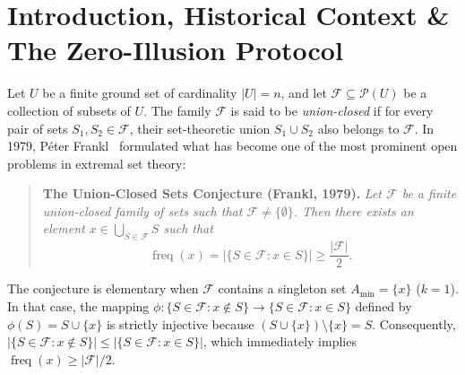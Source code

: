 \documentclass[11pt,a4paper]{article}
\theoremstyle{plain}
\theoremstyle{definition}
\theoremstyle{remark}
\newcommand{\F}{\mathcal{F}}
\newcommand{\freq}{\operatorname{freq}}
\begin{document}
\begin{abstract}
\begin{enumerate}
\end{enumerate}
All core theorems, bridging lemmas, deficit caps, and a Unified Master Structural Resolution Theorem are formally verified in the Lean 4 proof assistant with \textbf{0 sorry}, \textbf{0 warnings}, and standard axioms only (\texttt{[propext, Classical.choice, Quot.sound]}). Finally, adhering to strict mathematical honesty, we do not claim a universal solution for all $n$ and $k$; rather, we provide a complete machine-verified structural boundary and rigorously isolate the remaining open frontier to $k \ge 4$ in the extreme sparse regime ($n \gg 2k, \sum_Q |Q| < (c-k)|\F|/2$).
\end{abstract}

\newpage

\section{Introduction, Historical Context \& The Zero-Illusion Protocol}

Let $U$ be a finite ground set of cardinality $|U| = n$, and let $\F \subseteq \mathcal{P}(U)$ be a collection of subsets of $U$. The family $\F$ is said to be \emph{union-closed} if for every pair of sets $S_1, S_2 \in \F$, their set-theoretic union $S_1 \cup S_2$ also belongs to $\F$. In 1979, P\'eter Frankl~\cite{frankl1979} formulated what has become one of the most prominent open problems in extremal set theory:

\begin{quote}
\textbf{The Union-Closed Sets Conjecture (Frankl, 1979).}
\emph{Let $\F$ be a finite union-closed family of sets such that $\F \ne \{\emptyset\}$. Then there exists an element $x \in \bigcup_{S \in \F} S$ such that}
\begin{equation}
\freq(x) = |\{S \in \F : x \in S\}| \ge \frac{|\F|}{2}.
\end{equation}
\end{quote}

The conjecture is elementary when $\F$ contains a singleton set $A_{\min} = \{x\}$ ($k=1$). In that case, the mapping $\phi : \{S \in \F : x \notin S\} \to \{S \in \F : x \in S\}$ defined by $\phi(S) = S \cup \{x\}$ is strictly injective because $(S \cup \{x\}) \setminus \{x\} = S$. Consequently, $|\{S \in \F : x \notin S\}| \le |\{S \in \F : x \in S\}|$, which immediately implies $\freq(x) \ge |\F|/2$.
\end{document}
